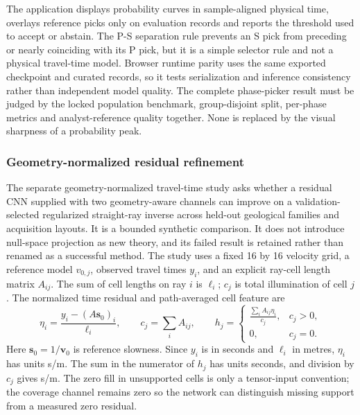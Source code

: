 The application displays probability curves in sample-aligned physical
time, overlays reference picks only on evaluation records and reports
the threshold used to accept or abstain. The P-S separation rule prevents
an S pick from preceding or nearly coinciding with its P pick, but it is
a simple selector rule and not a physical travel-time model. Browser
runtime parity uses the same exported checkpoint and curated records,
so it tests serialization and inference consistency rather than
independent model quality. The complete phase-picker result must be judged by the
locked population benchmark, group-disjoint split, per-phase metrics and
analyst-reference quality together. None is replaced by the visual
sharpness of a probability peak.

\subsubsection{Geometry-normalized residual refinement}\label{method-geometry-normalized}

The separate geometry-normalized travel-time study asks whether a
residual CNN supplied with two geometry-aware channels can improve on a
validation-selected regularized straight-ray inverse across held-out
geological families and acquisition layouts. It is a bounded synthetic
comparison. It does not introduce null-space projection as new theory,
and its failed result is retained rather than renamed as a successful
method. The study uses a fixed 16 by 16 velocity grid, a reference model
$v_{0,j}$, observed travel times $y_i$, and an explicit ray-cell length
matrix $A_{ij}$. The sum of cell lengths on ray $i$ is $\ell_i$;
$c_j$ is total illumination of cell $j$. The normalized time residual
and path-averaged cell feature are
\begin{equation}\label{eq:geometry-normalized-feature}
 \eta_i=\frac{y_i-(A\mathbf s_0)_i}{\ell_i},\qquad
 c_j=\sum_i A_{ij},\qquad
 h_j=\begin{cases}
 \frac{\sum_i A_{ij}\eta_i}{c_j},&c_j>0,\\
 0,&c_j=0.
 \end{cases}
\end{equation}
Here $\mathbf s_0=1/\mathbf v_0$ is reference slowness. Since $y_i$ is
in seconds and $\ell_i$ in metres, $\eta_i$ has units s/m. The sum in
the numerator of $h_j$ has units seconds, and division by $c_j$ gives
s/m. The zero fill in unsupported cells is only a tensor-input
convention; the coverage channel remains zero so the network can
distinguish missing support from a measured zero residual.

